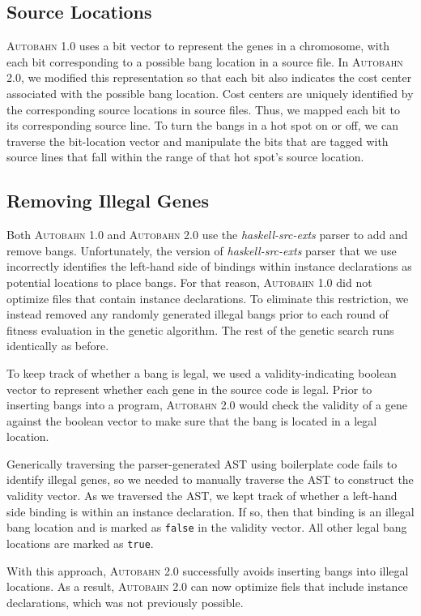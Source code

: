 \documentclass[format=sigplan, review=true]{acmart}
\newcommand{\hotspot}[0]{hot spot}
\newcommand{\Ao}[0]{\textsc{Autobahn 1.0}}
\newcommand{\At}[0]{\textsc{Autobahn 2.0}}
\begin{document}
\subsection{Source Locations}
\Ao{} uses a bit vector to represent the genes in a
chromosome, with each bit corresponding to a possible bang location in
a source file.  In \At{}, we modified this representation so that each
bit also indicates the cost center associated with the possible bang
location.   Cost centers are uniquely identified by the corresponding source
locations in source files.  Thus, we mapped each bit to its corresponding
source line. To turn the bangs in a \hotspot{} on or off, we can
traverse the bit-location vector and manipulate the bits that are
tagged with source lines that fall within the range of
that \hotspot{}'s source location.

\subsection{Removing Illegal Genes}
Both \Ao{} and \At{} use the \textit{haskell-src-exts} parser to add
and remove bangs.  
Unfortunately, the version of \textit{haskell-src-exts} parser that we use
incorrectly identifies the left-hand side of bindings within instance
declarations as potential locations to place bangs. For that reason,
\Ao{} did not optimize files that contain instance declarations. 
To eliminate this restriction, we instead removed any randomly
generated illegal bangs prior to each round of fitness evaluation in
the genetic algorithm. The rest of the genetic search runs
identically as before.

To keep track of whether a bang is legal, we used a
validity-indicating boolean vector to represent whether each gene in
the source code is legal. Prior to inserting bangs into a
program, \At{} would check the validity of a gene against the boolean
vector to make sure that the bang is located in a legal location.

Generically traversing the parser-generated AST using boilerplate code
fails to identify illegal genes, so we needed to manually traverse the AST
to construct the validity vector. As we traversed the AST, we kept
track of whether a left-hand side binding is within an instance
declaration. If so, then that binding is an illegal bang location and
is marked as \texttt{false} in the validity vector. All other
legal bang locations are marked as  \texttt{true}.

With this approach, \At{} successfully avoids inserting bangs into
illegal locations.  As a result, \At{} can now optimize fiels that
include instance declarations, which was not previously possible.
\end{document}

